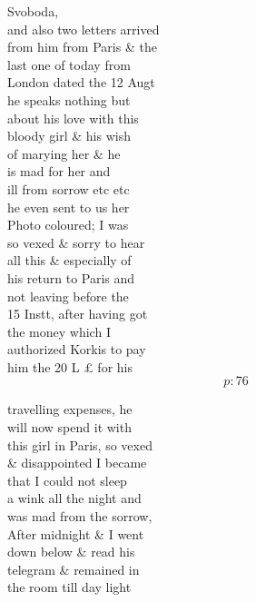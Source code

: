 \documentclass{report}
\begin{document}
	\par{
 	Svoboda,\ \\and also two letters arrived\ \\from him from Paris \& the\ \\last one of today from\ \\London dated the 12 Augt\ \\he speaks nothing but\ \\about his love with this\ \\bloody girl \& his wish\ \\of marying her \& he\ \\is mad for her and\ \\ill from sorrow etc etc\ \\he even sent to us her\ \\Photo coloured; I was\ \\so vexed \& sorry to hear\ \\all this \& especially of\ \\his return to Paris and\ \\not leaving before the\ \\15 Instt, after having got\ \\the money which I\ \\authorized Korkis to pay\ \\him the 20 L £ for his\ \\
  \[p: 76 \]

	}


	\par{
 	travelling expenses, he\ \\will now spend it with\ \\this girl in Paris, so vexed\ \\\& disappointed I became\ \\that I could not sleep\ \\a wink all the night and\ \\was mad from the sorrow,\ \\After midnight \& I went\ \\down below \& read his\ \\telegram \& remained in\ \\the room till day light\ \\\ \\
	}
\end{document}
